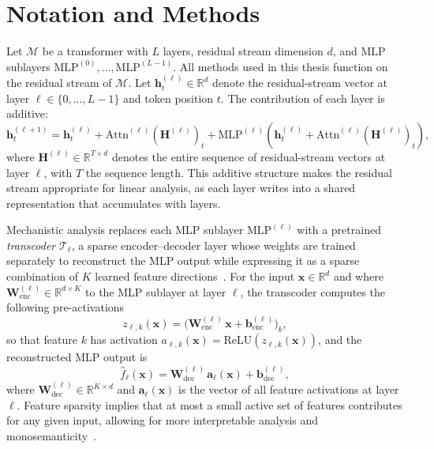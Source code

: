 \section{Notation and Methods}
\label{sec:interp-methods}
Let $\mathcal{M}$ be a transformer with $L$ layers, residual stream dimension $d$, and MLP
sublayers $\mathrm{MLP}^{(0)}, \ldots, \mathrm{MLP}^{(L-1)}$.  All methods used in this
thesis function on the residual stream of $\mathcal{M}$.  Let $\mathbf{h}^{(\ell)}_t \in \mathbb{R}^d$
denote the residual-stream vector at layer $\ell \in \{0, \ldots, L{-}1\}$ and token position $t$.
The contribution of each layer is additive:
\begin{equation}
    \mathbf{h}^{(\ell+1)}_t = \mathbf{h}^{(\ell)}_t
      + \mathrm{Attn}^{(\ell)}\!\left(\mathbf{H}^{(\ell)}\right)_t
      + \mathrm{MLP}^{(\ell)}\!\left(\mathbf{h}^{(\ell)}_t + \mathrm{Attn}^{(\ell)}\!\left(\mathbf{H}^{(\ell)}\right)_t\right),
    \label{eq:residual}
\end{equation}
where $\mathbf{H}^{(\ell)} \in \mathbb{R}^{T \times d}$ denotes the entire sequence of residual-stream
vectors at layer $\ell$, with $T$ the sequence length.
This additive structure makes the residual stream appropriate for linear analysis, as each
layer writes into a shared representation that accumulates with layers.

Mechanistic analysis replaces each MLP sublayer $\mathrm{MLP}^{(\ell)}$ with a pretrained
\textit{transcoder} $\mathcal{T}_\ell$, a sparse encoder--decoder layer whose weights are trained separately 
to reconstruct the MLP output while expressing it as a sparse combination of \(K\) learned feature directions~\citep{bricken2023monosemanticity, cunningham2023sparse}.  
For the input $\mathbf{x} \in \mathbb{R}^d$ and where $\mathbf{W}_\mathrm{enc}^{(\ell)} \in \mathbb{R}^{d \times K}$  to the MLP sublayer at layer $\ell$, the transcoder computes
the following pre-activations
\begin{equation}
  z_{\ell,k}(\mathbf{x})
    = \bigl(\mathbf{W}_\mathrm{enc}^{(\ell)}\,\mathbf{x}
           + \mathbf{b}_\mathrm{enc}^{(\ell)}\bigr)_k,
  \label{eq:preact}
\end{equation}
so that feature $k$ has activation
$a_{\ell,k}(\mathbf{x}) = \mathrm{ReLU}(z_{\ell,k}(\mathbf{x}))$,
and the reconstructed MLP output is
\begin{equation}
  \hat{f}_\ell(\mathbf{x})
    = \mathbf{W}_\mathrm{dec}^{(\ell)}\,\mathbf{a}_\ell(\mathbf{x})
    + \mathbf{b}_\mathrm{dec}^{(\ell)},
  \label{eq:recon}
\end{equation}
where $\mathbf{W}_\mathrm{dec}^{(\ell)} \in \mathbb{R}^{K \times d}$ and
$\mathbf{a}_\ell(\mathbf{x})$ is the vector of all feature activations at layer $\ell$.
Feature sparsity implies that at most a
small active set of features contributes for any given input, allowing for more interpretable analysis and monosemanticity~\cite{bricken2023monosemanticity}.


